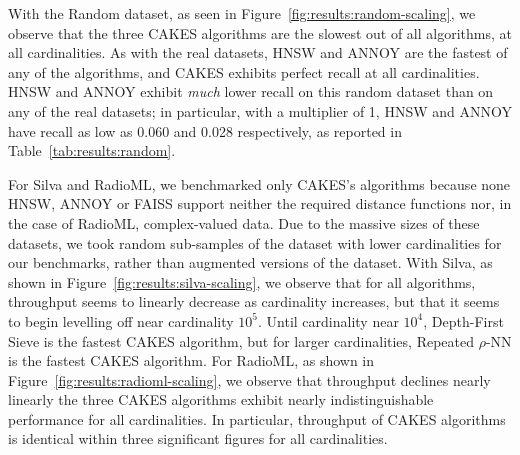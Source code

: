 With the Random dataset, as seen in Figure~\ref{fig:results:random-scaling}, we observe that the three CAKES algorithms are the slowest out of all algorithms, at all cardinalities.
As with the real datasets, HNSW and ANNOY are the fastest of any of the algorithms, and CAKES exhibits perfect recall at all cardinalities.
HNSW and ANNOY exhibit \emph{much} lower recall on this random dataset than on any of the real datasets;
in particular, with a multiplier of 1, HNSW and ANNOY have recall as low as 0.060 and 0.028 respectively, as reported in Table~\ref{tab:results:random}.

For Silva and RadioML, we benchmarked only CAKES's algorithms because none HNSW, ANNOY or FAISS support neither the required distance functions nor, in the case of RadioML, complex-valued data.
Due to the massive sizes of these datasets, we took random sub-samples of the dataset with lower cardinalities for our benchmarks, rather than augmented versions of the dataset.
With Silva, as shown in Figure~\ref{fig:results:silva-scaling}, we observe that for all algorithms, throughput seems to linearly decrease as cardinality increases, but that it seems to begin levelling off near cardinality $10^5$.
Until cardinality near $10^4$, Depth-First Sieve is the fastest CAKES algorithm, but for larger cardinalities, Repeated $\rho$-NN is the fastest CAKES algorithm.
For RadioML, as shown in Figure~\ref{fig:results:radioml-scaling}, we observe that throughput declines nearly linearly the three CAKES algorithms exhibit nearly indistinguishable performance for all cardinalities.
In particular, throughput of CAKES algorithms is identical within three significant figures for all cardinalities.


